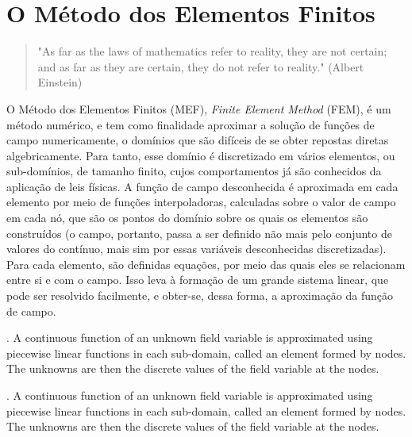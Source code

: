 \chapter{O Método dos Elementos Finitos}

\begin{quote}
    "As far as the laws of mathematics refer to reality, they are not certain; and as far as they are certain, they do not refer to reality." (Albert Einstein)
\end{quote}


O Método dos Elementos Finitos (MEF), \emph{Finite Element Method} (FEM), é um método numérico, e tem como finalidade aproximar a solução de funções de campo numericamente, o domínios que são difíceis de se obter repostas diretas algebricamente. Para tanto, esse domínio é discretizado em vários elementos, ou sub-domínios, de tamanho finito, cujos comportamentos já são conhecidos da aplicação de leis físicas. A função de campo desconhecida é aproximada em cada elemento por meio de funções interpoladoras, calculadas sobre o valor de campo em cada nó, que são os pontos do domínio sobre os quais os elementos são construídos (o campo, portanto, passa a ser definido não mais pelo conjunto de valores do contínuo, mais sim por essas variáveis desconhecidas discretizadas). Para cada elemento, são definidas equações, por meio das quais eles se relacionam entre si e com o campo. Isso leva à formação de um grande sistema linear, que pode ser resolvido facilmente, e obter-se, dessa forma, a aproximação da função de campo. \cite{Onate}

. A continuous function of an unknown field variable is approximated
using piecewise linear functions in each sub-domain, called an element formed by nodes.
The unknowns are then the discrete values of the field variable at the nodes. 

. A continuous function of an unknown field variable is approximated
using piecewise linear functions in each sub-domain, called an element formed by nodes.
The unknowns are then the discrete values of the field variable at the nodes. 